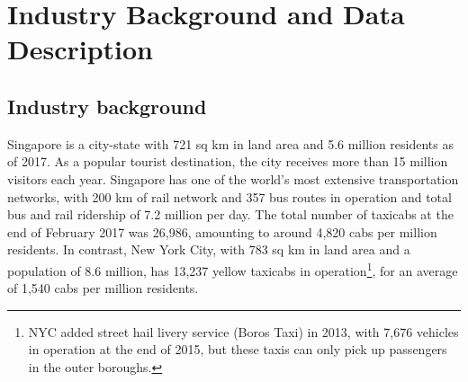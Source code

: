 \documentclass[reviewmode,AEJ]{AEA}
\begin{document}


\section{Industry Background and Data Description}
\label{sec:background}

\subsection{Industry background}
Singapore is a city-state with 721 sq km in land area and 5.6 million residents as of 2017. 
As a popular tourist destination, the city receives more than 15 million visitors each year.
Singapore has one of the world's most extensive transportation networks, with 200 km of rail network and
357 bus routes in operation
and total bus and rail ridership of 7.2 million per day.  
The total number of taxicabs at the end of February 2017 was 26,986, amounting to around 4,820 cabs
per million residents. In contrast, New York City, with 783 sq km in land area and a population of
8.6 million, has 13,237 yellow taxicabs in operation\footnote{NYC added street hail livery service
(Boros Taxi) in 2013, with 7,676 vehicles in operation at the end of 2015, but these taxis can only
pick up passengers in the outer boroughs.}, for an average of 1,540 cabs per million residents.
\end{document}
